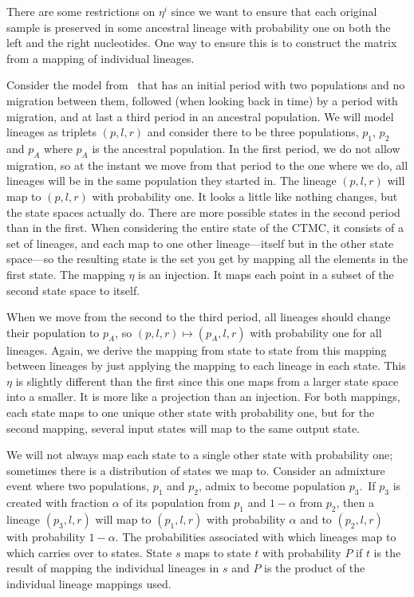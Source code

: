\documentclass[graybox]{svmult}
\begin{document}
There are some restrictions on $\eta^i$ since we want to ensure that each original sample is preserved in some ancestral lineage with probability one on both the left and the right nucleotides. One way to ensure this is to construct the matrix from a mapping of individual lineages.

Consider the model from \citet{Mailund:2012ewa}\ that has an initial period with two populations and no migration between them, followed (when looking back in time) by a period with migration, and at last a third period in an ancestral population. We will model lineages as triplets $(p,l,r)$ and consider there to be three populations, $p_1$, $p_2$ and $p_A$ where $p_A$ is the ancestral population. In the first period, we do not allow migration, so at the instant we move from that period to the one where we do, all lineages will be in the same population they started in. The lineage $(p,l,r)$ will map to $(p,l,r)$ with probability one. It looks a little like nothing changes, but the state spaces actually do. There are more possible states in the second period than in the first. When considering the entire state of the CTMC, it consists of a set of lineages, and each map to one other lineage---itself but in the other state space---so the resulting state is the set you get by mapping all the elements in the first state. The mapping $\eta$ is an injection. It maps each point in a subset of the second state space to itself.

When we move from the second to the third period, all lineages should change their population to $p_A$, so $(p,l,r)\mapsto(p_A,l,r)$ with probability one for all lineages. Again, we derive the mapping from state to state from this mapping between lineages by just applying the mapping to each lineage in each state. This $\eta$ is slightly different than the first since this one maps from a larger state space into a smaller. It is more like a projection than an injection. For both mappings, each state maps to one unique other state with probability one, but for the second mapping, several input states will map to the same output state.

We will not always map each state to a single other state with probability one; sometimes there is a distribution of states we map to. Consider an admixture event where two populations, $p_1$ and $p_2$, admix to become population $p_3$.\ If $p_3$ is created with fraction $\alpha$ of its population from $p_1$ and $1-\alpha$ from $p_2$, then a lineage $(p_3,l,r)$ will map to $(p_1,l,r)$ with probability $\alpha$ and to $(p_2,l,r)$ with probability $1-\alpha$. The probabilities associated with which lineages map to which carries over to states. State $s$ maps to state $t$ with probability $P$ if $t$ is the result of mapping the individual lineages in $s$ and $P$ is the product of the individual lineage mappings used.
\end{document}
